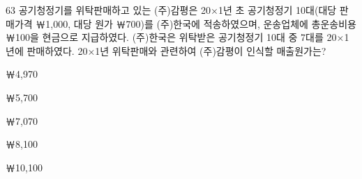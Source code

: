 \begin{question}{63}
공기청정기를 위탁판매하고 있는 (주)감평은 20×1년 초 공기청정기 10대(대당 판매가격 ￦1,000, 대당 원가 ￦700)를 (주)한국에 적송하였으며, 운송업체에 총운송비용 ￦100을 현금으로 지급하였다. (주)한국은 위탁받은 공기청정기 10대 중 7대를 20×1년에 판매하였다. 20×1년 위탁판매와 관련하여 (주)감평이 인식할 매출원가는?
\begin{choices}
  \item ￦4,970
  \item ￦5,700
  \item ￦7,070
  \item ￦8,100
  \item ￦10,100
\end{choices}
\end{question}
